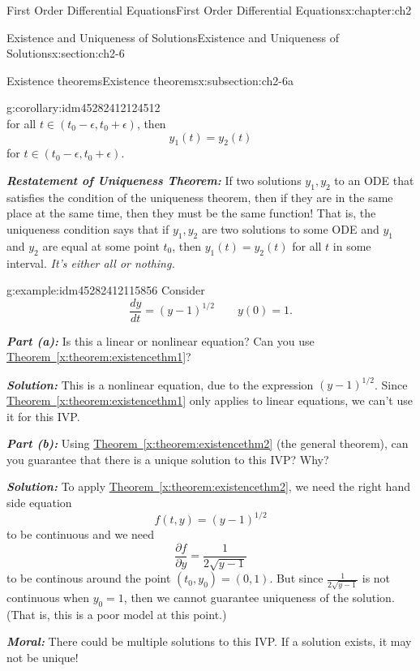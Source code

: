 \documentclass[oneside,10pt,]{book}
\newcommand{\alert}[1]{\textbf{\textit{#1}}}
\numberwithin{equation}{section}
\numberwithin{equation}{section}
\begin{document}
\begin{chapterptx}{First Order Differential Equations}{}{First Order Differential Equations}{}{}{x:chapter:ch2}
\begin{sectionptx}{Existence and Uniqueness of Solutions}{}{Existence and Uniqueness of Solutions}{}{}{x:section:ch2-6}
\begin{subsectionptx}{Existence theorems}{}{Existence theorems}{}{}{x:subsection:ch2-6a}
\begin{corollary}{}{}{g:corollary:idm45282412124512}
\begin{equation*}
\end{equation*}
for all \(t\in\left(t_{0}-\epsilon,t_{0}+\epsilon\right)\), then%
\begin{equation*}
y_{1}(t)=y_{2}(t)
\end{equation*}
for \(t\in\left(t_{0}-\epsilon,t_{0}+\epsilon\right)\).%
\end{corollary}
\alert{Restatement of Uniqueness Theorem:} If two solutions \(y_{1},y_{2}\) to an ODE that satisfies the condition of the uniqueness theorem, then if they are in the same place at the same time, then they must be the same function! That is, the uniqueness condition says that if \(y_{1},y_{2}\) are two solutions to some ODE and \(y_{1}\) and \(y_{2}\) are equal at some point \(t_{0}\), then \(y_{1}(t)=y_{2}(t)\) for all \(t\) in some interval. \emph{It's either all or nothing.}%
\begin{example}{}{g:example:idm45282412115856}%
Consider%
\begin{equation*}
\frac{dy}{dt}=(y-1)^{1/2}\qquad y(0)=1.
\end{equation*}
%
\par
\alert{Part (a):} Is this a linear or nonlinear equation? Can you use \hyperref[x:theorem:existencethm1]{Theorem~\ref{x:theorem:existencethm1}}?%
\par
\alert{Solution:} This is a nonlinear equation, due to the expression \((y-1)^{1/2}\). Since \hyperref[x:theorem:existencethm1]{Theorem~\ref{x:theorem:existencethm1}} only applies to linear equations, we can't use it for this IVP.%
\par
\alert{Part (b):} Using \hyperref[x:theorem:existencethm2]{Theorem~\ref{x:theorem:existencethm2}} (the general theorem), can you guarantee that there is a unique solution to this IVP? Why?%
\par
\alert{Solution:} To apply \hyperref[x:theorem:existencethm2]{Theorem~\ref{x:theorem:existencethm2}}, we need the right hand side equation%
\begin{equation*}
f(t,y)=(y-1)^{1/2}
\end{equation*}
to be continuous and we need%
\begin{equation*}
\frac{\partial f}{\partial y}=\frac{1}{2\sqrt{y-1}}
\end{equation*}
to be continous around the point \((t_{0},y_{0})=(0,1)\). But since \(\frac{1}{2\sqrt{y-1}}\) is not continuous when \(y_{0}=1\), then we cannot guarantee uniqueness of the solution. (That is, this is a poor model at this point.)%
\par
\alert{Moral:} There could be multiple solutions to this IVP. If a solution exists, it may not be unique!%

\end{example}
\end{subsectionptx}
\end{sectionptx}
\end{chapterptx}
\end{document}
